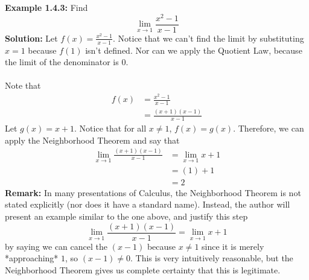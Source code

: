 \documentclass{article}
\begin{document}
	\textbf{Example 1.4.3:} Find
	$$\lim_{x \to 1}{\frac{x^2 - 1}{x - 1}}$$
	\textbf{Solution:} Let $f(x) = \frac{x^2 - 1}{x - 1}$. Notice that we can't find the limit by substituting $x = 1$ because $f(1)$ isn't defined. Nor can we apply the Quotient Law, because the limit of the denominator is $0$. \\\\
	Note that
	\begin{align*}
		f(x) &= \frac{x^2 - 1}{x - 1} \\
		     &= \frac{(x + 1)(x - 1)}{x - 1}
	\end{align*}
	Let $g(x) = x + 1$. Notice that for all $x \neq 1$, $f(x) = g(x)$. Therefore, we can apply the Neighborhood Theorem and say that
	\begin{align*}
		\lim_{x \to 1}{\frac{(x + 1)(x - 1)}{x - 1}} &= \lim_{x \to 1}{x + 1} \\
		                                      &= (1) + 1 \tag{Thrm 1.4.8}\\
		                                      &= 2
	\end{align*}
	\textbf{Remark:} In many presentations of Calculus, the Neighborhood Theorem is not stated explicitly (nor does it have a standard name). Instead, the author will present an example similar to the one above, and justify this step
	$$\lim_{x \to 1}{\frac{(x + 1)(x - 1)}{x - 1}} = \lim_{x \to 1}{x + 1}$$
	by saying we can cancel the $(x-1)$ because $x \neq 1$ since it is merely *approaching* $1$, so $(x - 1) \neq 0$. This is very intuitively reasonable, but the Neighborhood Theorem gives us complete certainty that this is legitimate.
\end{document}
